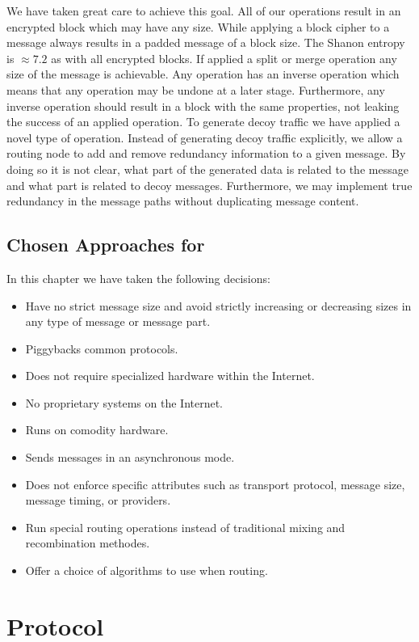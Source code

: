 We have taken great care to achieve this goal. All of our operations result in an encrypted block which may have any size. While applying a block cipher to a message always results in a padded message of a block size. The Shanon entropy is $\approx 7.2$ as with all encrypted blocks. If applied a split or merge operation any size of the message is achievable. Any operation has an inverse operation which means that any operation may be undone at a later stage. Furthermore, any inverse operation should result in a block with the same properties, not leaking the success of an applied operation. To generate decoy traffic we have applied a novel type of operation. Instead of generating decoy traffic explicitly, we allow a routing node to add and remove redundancy information to a given message. By doing so it is not clear, what part of the generated data is related to the message and what part is related to decoy messages. Furthermore, we may implement true redundancy in the message paths without duplicating message content.

\section{Chosen Approaches for \MessageVortex}
In this chapter we have taken the following decisions:
\begin{itemize}
	\item Have no strict message size and avoid strictly increasing or decreasing sizes in any type of message or message part.
	\item Piggybacks common protocols.
	\item Does not require specialized hardware within the Internet.
	\item No proprietary systems on the Internet.
	\item Runs on comodity hardware.
	\item Sends messages in an asynchronous mode.
	\item Does not enforce specific attributes such as transport protocol, message size, message timing, or providers.
	\item Run special routing operations instead of traditional mixing and recombination methodes.
	\item Offer a choice of algorithms to use when routing.
\end{itemize}


\chapter{Protocol}\label{sec:protocol}
